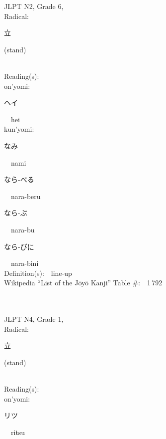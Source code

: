 \begin{multicols}{2}
{JLPT N2, Grade 6, \\Radical:\ \ {\begin{CJK}{UTF8}{min} 立 \end{CJK}} (stand) } \\
Reading(s):\ \ \\
{\hspace*{1em}}on'yomi:\ \ \\
{\hspace*{2em}}{\begin{CJK}{UTF8}{min} ヘイ \end{CJK}}\ \ hei\ \ \\
{\hspace*{1em}}kun'yomi:\ \ \\
{\hspace*{2em}}{\begin{CJK}{UTF8}{min} なみ \end{CJK}}\ \ nami\ \ \\
{\hspace*{2em}}{\begin{CJK}{UTF8}{min} なら-べる \end{CJK}}\ \ nara-beru\ \ \\
{\hspace*{2em}}{\begin{CJK}{UTF8}{min} なら-ぶ \end{CJK}}\ \ nara-bu\ \ \\
{\hspace*{2em}}{\begin{CJK}{UTF8}{min} なら-びに \end{CJK}}\ \ nara-bini\ \ \\
Definition(s):\ \ line-up \\
Wikipedia ``List of the J\=oy\=o Kanji'' Table \#:\ \ 1\,792 \\
\ \ \\
{\fontsize{34pt}{40pt}  }\ \ \\  %
{JLPT N4, Grade 1, \\Radical:\ \ {\begin{CJK}{UTF8}{min} 立 \end{CJK}} (stand) } \\
Reading(s):\ \ \\
{\hspace*{1em}}on'yomi:\ \ \\
{\hspace*{2em}}{\begin{CJK}{UTF8}{min} リツ \end{CJK}}\ \ ritsu\ \ \\

\end{multicols}
